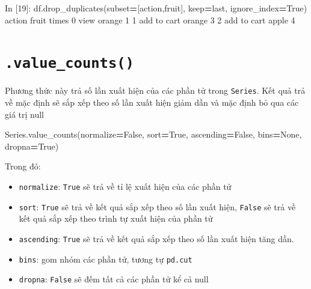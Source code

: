 \documentclass[
]{book}
\newenvironment{Shaded}{\begin{snugshade}}{\end{snugshade}}
\newcommand{\DecValTok}[1]{\textcolor[rgb]{0.00,0.00,0.81}{#1}}
\newcommand{\NormalTok}[1]{#1}
\newcommand{\OperatorTok}[1]{\textcolor[rgb]{0.81,0.36,0.00}{\textbf{#1}}}
\newcommand{\StringTok}[1]{\textcolor[rgb]{0.31,0.60,0.02}{#1}}
\newcommand{\VariableTok}[1]{\textcolor[rgb]{0.00,0.00,0.00}{#1}}
\begin{document}
\begin{Shaded}
\begin{Highlighting}[]
\NormalTok{In [}\DecValTok{19}\NormalTok{]: df.drop\_duplicates(subset}\OperatorTok{=}\NormalTok{[}\StringTok{\textquotesingle{}action\textquotesingle{}}\NormalTok{,}\StringTok{\textquotesingle{}fruit\textquotesingle{}}\NormalTok{], keep}\OperatorTok{=}\StringTok{\textquotesingle{}last\textquotesingle{}}\NormalTok{, ignore\_index}\OperatorTok{=}\VariableTok{True}\NormalTok{)}
\NormalTok{        action   fruit  times}
\DecValTok{0}\NormalTok{         view  orange      }\DecValTok{1}
\DecValTok{1}\NormalTok{  add to cart  orange      }\DecValTok{3}
\DecValTok{2}\NormalTok{  add to cart   apple      }\DecValTok{4}
\end{Highlighting}
\end{Shaded}

\hypertarget{value_counts}{%
\section{\texorpdfstring{\texttt{.value\_counts()}}{.value\_counts()}}\label{value_counts}}

Phương thức này trả số lần xuất hiện của các phần tử trong \texttt{Series}. Kết quả trả về mặc định sẽ sắp xếp theo số lần xuất hiện giảm dần và mặc định bỏ qua các giá trị null

\begin{Shaded}
\begin{Highlighting}[]
\NormalTok{Series.value\_counts(normalize}\OperatorTok{=}\VariableTok{False}\NormalTok{, sort}\OperatorTok{=}\VariableTok{True}\NormalTok{, ascending}\OperatorTok{=}\VariableTok{False}\NormalTok{, bins}\OperatorTok{=}\VariableTok{None}\NormalTok{, dropna}\OperatorTok{=}\VariableTok{True}\NormalTok{)}
\end{Highlighting}
\end{Shaded}

Trong đó:

\begin{itemize}
\item
  \texttt{normalize}: \texttt{True} sẽ trả về tỉ lệ xuất hiện của các phần tử
\item
  \texttt{sort}: \texttt{True} sẽ trả về kết quả sắp xếp theo số lần xuất hiện, \texttt{False} sẽ trả về kết quả sắp xếp theo trình tự xuất hiện của phần tử
\item
  \texttt{ascending}: \texttt{True} sẽ trả về kết quả sắp xếp theo số lần xuất hiện tăng dần.
\item
  \texttt{bins}: gom nhóm các phần tử, tương tự \texttt{pd.cut}
\item
  \texttt{dropna}: \texttt{False} sẽ đếm tất cả các phần tử kể cả null
\end{itemize}
\end{document}
